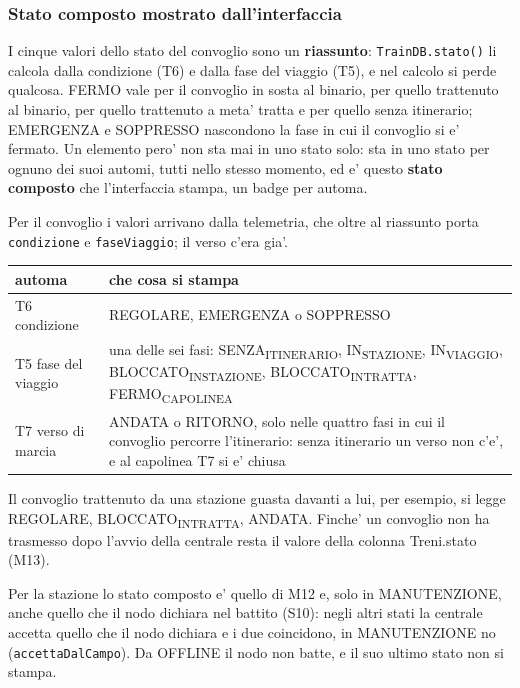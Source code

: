 \documentclass[11pt]{article}
\begin{document}
\subsubsection{Stato composto mostrato dall'interfaccia}
\label{sec:orgd8be30c}

I cinque valori dello stato del convoglio sono un \textbf{riassunto}: \texttt{TrainDB.stato()} li calcola dalla
condizione (T6) e dalla fase del viaggio (T5), e nel calcolo si perde qualcosa. FERMO vale per il
convoglio in sosta al binario, per quello trattenuto al binario, per quello trattenuto a meta'
tratta e per quello senza itinerario; EMERGENZA e SOPPRESSO nascondono la fase in cui il convoglio
si e' fermato. Un elemento pero' non sta mai
in uno stato solo: sta in uno stato per ognuno dei suoi automi, tutti nello stesso momento, ed e'
questo \textbf{stato composto} che l'interfaccia stampa, un badge per automa.

Per il convoglio i valori arrivano dalla telemetria, che oltre al riassunto porta \texttt{condizione} e
\texttt{faseViaggio}; il verso c'era gia'.

\begin{center}
\begin{tabular}{|p{}|p{}|}
automa & che cosa si stampa\\
\hline
T6 condizione & REGOLARE, EMERGENZA o SOPPRESSO\\
T5 fase del viaggio & una delle sei fasi: SENZA\textsubscript{ITINERARIO}, IN\textsubscript{STAZIONE}, IN\textsubscript{VIAGGIO}, BLOCCATO\textsubscript{IN}\textsubscript{STAZIONE}, BLOCCATO\textsubscript{IN}\textsubscript{TRATTA}, FERMO\textsubscript{CAPOLINEA}\\
T7 verso di marcia & ANDATA o RITORNO, solo nelle quattro fasi in cui il convoglio percorre l'itinerario: senza itinerario un verso non c'e', e al capolinea T7 si e' chiusa\\
\end{tabular}
\end{center}

Il convoglio trattenuto da una stazione guasta davanti a lui, per esempio, si legge REGOLARE,
BLOCCATO\textsubscript{IN}\textsubscript{TRATTA}, ANDATA. Finche' un convoglio non ha trasmesso dopo l'avvio della centrale
resta il valore della colonna Treni.stato (M13).

Per la stazione lo stato composto e' quello di M12 e, solo in MANUTENZIONE, anche quello che il
nodo dichiara nel battito (S10): negli altri stati la centrale accetta quello che il nodo dichiara
e i due coincidono, in MANUTENZIONE no (\texttt{accettaDalCampo}). Da OFFLINE il nodo non batte, e il suo
ultimo stato non si stampa.
\end{document}
